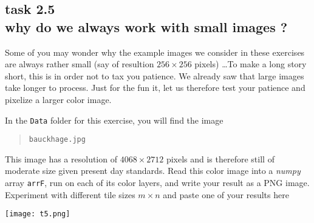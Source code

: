 
\subsection*{task 2.5 \\[1ex] why do we always work with small images ?}

Some of you may wonder why the example images we consider in these exercises are always rather small (say of resultion $256 \times 256$ pixels) \ldots To make a long story short, this is in order not to tax you patience. We already saw that large images take longer to process. Just for the fun it, let us therefore test your patience and pixelize a larger color image.  

In the \texttt{Data} folder for this exercise, you will find the image
\begin{quote}
    \texttt{bauckhage.jpg}
\end{quote}
This image has a resolution of $4068 \times 2712$ pixels and is therefore still of moderate size given present day standards. Read this color image into a \emph{numpy} array \texttt{arrF}, run  on each of its color layers, and write your result as a PNG image. Experiment with different tile sizes $m \times n$ and paste one of your results here \\[1cm]
\begin{center}
\texttt{[image: t5.png]} 
\end{center}





